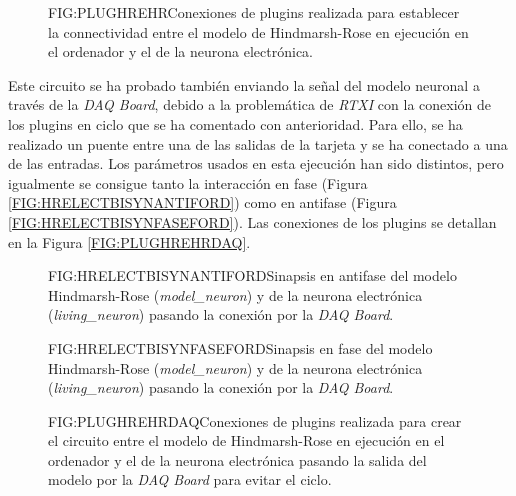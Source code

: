 \begin{figure}[Esquema de conexión de plugins para crear el circuito entre el modelo y la neurona electrónica]{FIG:PLUGHREHR}{Conexiones de plugins realizada para establecer la connectividad entre el modelo de Hindmarsh-Rose en ejecución en el ordenador y el de la neurona electrónica.}
\end{figure}\textbf{}

Este circuito se ha probado también enviando la señal del modelo neuronal a través de la \textit{DAQ Board}, debido a la problemática de \textit{RTXI} con la conexión de los plugins en ciclo que se ha comentado con anterioridad. Para ello, se ha realizado un puente entre una de las salidas de la tarjeta y se ha conectado a una de las entradas. Los parámetros usados en esta ejecución han sido distintos, pero igualmente se consigue tanto la interacción en fase (Figura \ref{FIG:HRELECTBISYNANTIFORD}) como en antifase (Figura \ref{FIG:HRELECTBISYNFASEFORD}). Las conexiones de los plugins se detallan en la Figura \ref{FIG:PLUGHREHRDAQ}.

\begin{figure}[Sinapsis bidireccional modelo-electrónica en antifase con forwarding]{FIG:HRELECTBISYNANTIFORD}{Sinapsis en antifase del modelo Hindmarsh-Rose (\textit{model\_neuron}) y de la neurona electrónica (\textit{living\_neuron}) pasando la conexión por la \textit{DAQ Board}.}
\end{figure}

\begin{figure}[Sinapsis bidireccional modelo-electrónica en fase con forwarding]{FIG:HRELECTBISYNFASEFORD}{Sinapsis en fase del modelo Hindmarsh-Rose (\textit{model\_neuron}) y de la neurona electrónica (\textit{living\_neuron}) pasando la conexión por la \textit{DAQ Board}.}
\end{figure}

\begin{figure}[Esquema de conexión de plugins para la sinapsis entre el modelo y la neurona electrónica con DAQ forwarding]{FIG:PLUGHREHRDAQ}{Conexiones de plugins realizada para crear el circuito entre el modelo de Hindmarsh-Rose en ejecución en el ordenador y el de la neurona electrónica pasando la salida del modelo por la \textit{DAQ Board} para evitar el ciclo.}
\end{figure}\textbf{}


